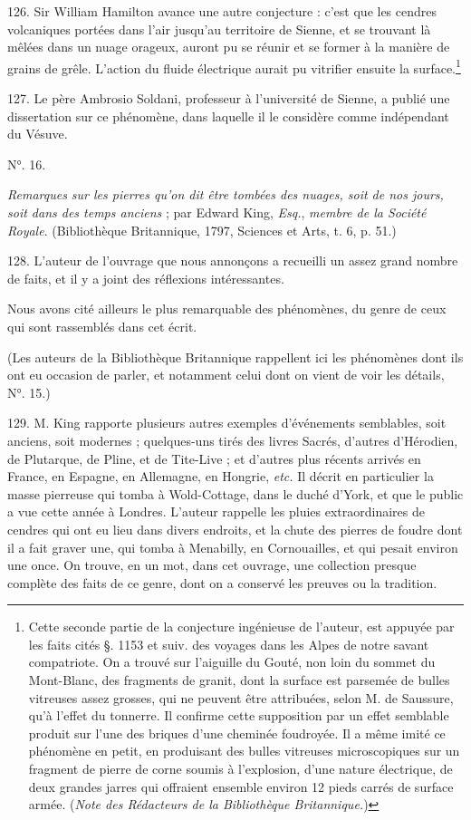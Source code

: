 \documentclass[a4paper, 11pt, oneside, polutonikogreek, french]{article}
\begin{document}
126. Sir William Hamilton avance une autre conjecture : c'est que les cendres volcaniques portées dans l'air jusqu'au territoire de Sienne, et se trouvant là mêlées dans un nuage orageux, auront pu se réunir et se former à la manière de grains de grêle. L'action du fluide électrique aurait pu vitrifier ensuite la surface.\footnote{Cette seconde partie de la conjecture ingénieuse de l'auteur, est appuyée par les faits cités §. 1153 et suiv. des voyages dans les Alpes de notre savant compatriote. On a trouvé sur l'aiguille du Gouté, non loin du sommet du Mont-Blanc, des fragments de granit, dont la surface est parsemée de bulles vitreuses assez grosses, qui ne peuvent être attribuées, selon M. de Saussure, qu'à l'effet du tonnerre. Il confirme cette supposition par un effet semblable produit sur l'une des briques d'une cheminée foudroyée. Il a même imité ce phénomène en petit, en produisant des bulles vitreuses microscopiques sur un fragment de pierre de corne soumis à l'explosion, d'une nature électrique, de deux grandes jarres qui offraient ensemble environ 12 pieds carrés de surface armée. (\emph{Note des Rédacteurs de la Bibliothèque Britannique.})}

127. Le père Ambrosio Soldani, professeur à l'université de Sienne, a publié une dissertation sur ce phénomène, dans laquelle il le considère comme indépendant du Vésuve.

\begin{center}
N°. 16.
\end{center}

\begin{center}
\emph{Remarques sur les pierres qu'on dit être tombées des nuages, soit de nos jours, soit dans des temps anciens} ; par Edward King, \emph{Esq.}, \emph{membre de la Société Royale}. (Bibliothèque Britannique, 1797, Sciences et Arts, t. 6, p. 51.)
\end{center}

128. L'auteur de l'ouvrage que nous annonçons a recueilli un assez grand nombre de faits, et il y a joint des réflexions intéressantes.

Nous avons cité ailleurs le plus remarquable des phénomènes, du genre de ceux qui sont rassemblés dans cet écrit.

(Les auteurs de la Bibliothèque Britannique rappellent ici les phénomènes dont ils ont eu occasion de parler, et notamment celui dont on vient de voir les détails, N°. 15.)

129. M. King rapporte plusieurs autres exemples d'événements semblables, soit anciens, soit modernes ; quelques-uns tirés des livres Sacrés, d'autres d'Hérodien, de Plutarque, de Pline, et de Tite-Live ; et d'autres plus récents arrivés en France, en Espagne, en Allemagne, en Hongrie, \emph{etc.} Il décrit en particulier la masse pierreuse qui tomba à Wold-Cottage, dans le duché d'York, et que le public a vue cette année à Londres. L'auteur rappelle les pluies extraordinaires de cendres qui ont eu lieu dans divers endroits, et la chute des pierres de foudre dont il a fait graver une, qui tomba à Menabilly, en Cornouailles, et qui pesait environ une once. On trouve, en un mot, dans cet ouvrage, une collection presque complète des faits de ce genre, dont on a conservé les preuves ou la tradition.
\end{document}
